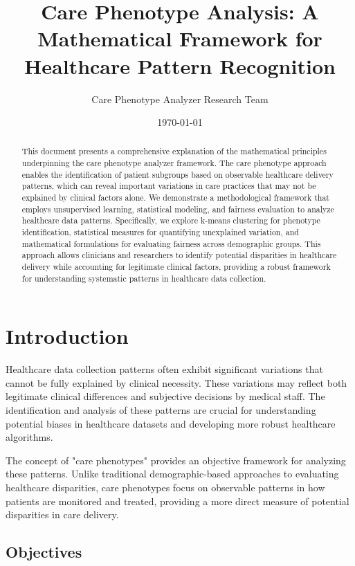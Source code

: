 \documentclass[12pt]{article}
\title{Care Phenotype Analysis: A Mathematical Framework for Healthcare Pattern Recognition}
\author{Care Phenotype Analyzer Research Team}
\date{\today}
\begin{document}
\maketitle

\begin{abstract}
This document presents a comprehensive explanation of the mathematical principles underpinning the care phenotype analyzer framework. The care phenotype approach enables the identification of patient subgroups based on observable healthcare delivery patterns, which can reveal important variations in care practices that may not be explained by clinical factors alone. We demonstrate a methodological framework that employs unsupervised learning, statistical modeling, and fairness evaluation to analyze healthcare data patterns. Specifically, we explore k-means clustering for phenotype identification, statistical measures for quantifying unexplained variation, and mathematical formulations for evaluating fairness across demographic groups. This approach allows clinicians and researchers to identify potential disparities in healthcare delivery while accounting for legitimate clinical factors, providing a robust framework for understanding systematic patterns in healthcare data collection.
\end{abstract}

\section{Introduction}

Healthcare data collection patterns often exhibit significant variations that cannot be fully explained by clinical necessity. These variations may reflect both legitimate clinical differences and subjective decisions by medical staff. The identification and analysis of these patterns are crucial for understanding potential biases in healthcare datasets and developing more robust healthcare algorithms.

The concept of "care phenotypes" provides an objective framework for analyzing these patterns. Unlike traditional demographic-based approaches to evaluating healthcare disparities, care phenotypes focus on observable patterns in how patients are monitored and treated, providing a more direct measure of potential disparities in care delivery.

\subsection{Objectives}
\end{document}
